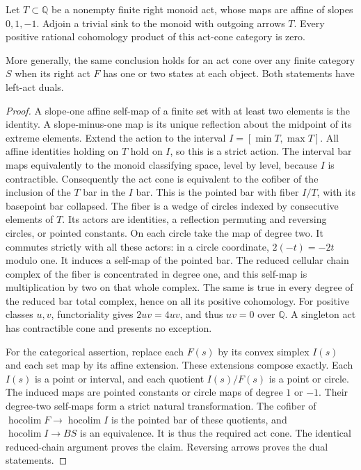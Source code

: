 \begin{lemma}
\label{CP2:A-high-affine}
Let $T\subset\mathbb Q$ be a nonempty finite right monoid act,
whose maps are affine of slopes $0,1,-1$.  Adjoin a trivial sink
to the monoid with outgoing arrows $T$.  Every positive rational
cohomology product of this act-cone category is zero.

More generally, the same conclusion holds for an act cone over
any finite category $S$ when its right act $F$ has one or two
states at each object.  Both statements have left-act duals.
\end{lemma}
\begin{proof}
A slope-one affine self-map of a finite set with at least two
elements is the identity.  A slope-minus-one map is its unique
reflection about the midpoint of its extreme elements.  Extend
the action to the interval $I=[\min T,\max T]$.  All affine
identities holding on $T$ hold on $I$, so this is a strict action.
The interval bar maps equivalently to the monoid classifying
space, level by level, because $I$ is contractible.  Consequently
the act cone is equivalent to the cofiber of the inclusion of
the $T$ bar in the $I$ bar.  This is the pointed bar with fiber
$I/T$, with its basepoint bar collapsed.  The fiber is a wedge
of circles indexed by consecutive elements of $T$.  Its actors
are identities, a reflection permuting and reversing circles,
or pointed constants.  On each circle take the map of degree two.
It commutes strictly with all these actors: in a circle coordinate,
$2(-t)=-2t$ modulo one.  It induces a self-map of the pointed bar.
The reduced cellular chain complex of the fiber is concentrated
in degree one, and this self-map is multiplication by two on
that whole complex.  The same is true in every degree of the
reduced bar total complex, hence on all its positive cohomology.
For positive classes $u,v$, functoriality gives $2uv=4uv$, and
thus $uv=0$ over $\mathbb Q$.  A singleton act has contractible
cone and presents no exception.

For the categorical assertion, replace each $F(s)$ by its convex
simplex $I(s)$ and each set map by its affine extension.  These
extensions compose exactly.  Each $I(s)$ is a point or interval,
and each quotient $I(s)/F(s)$ is a point or circle.  The induced
maps are pointed constants or circle maps of degree $1$ or $-1$.
Their degree-two self-maps form a strict natural transformation.
The cofiber of $\operatorname{hocolim}F\to\operatorname{hocolim}I$
is the pointed bar of these quotients, and
$\operatorname{hocolim}I\to BS$ is an equivalence.  It is thus
the required act cone.  The identical reduced-chain argument
proves the claim.  Reversing arrows proves the dual statements.
\end{proof}

